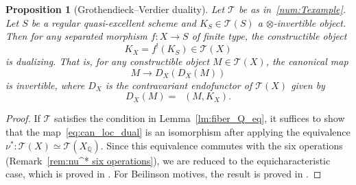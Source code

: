\documentclass[JEP,XML,SOM,Unicode]{cedram}
\newcommand{\T}{\mathscr T}
\DeclareMathOperator{\uHom}{\underline{Hom}}
\newcommand{\QQ} {\mathbb Q}
\newtheorem{prop}[thm]{Proposition}
\theoremstyle{remark}
\theoremstyle{definition}
\numberwithin{equation}{thm}
\begin{document}
\begin{prop}[Grothendieck--Verdier duality]\label{prop:duality}
Let $\T$ be as in~\ref{num:Texample}.
Let $S$ be a regular quasi-excellent scheme and $K_S \in \T(S)$ a $\otimes$-invertible object.
Then for any separated morphism $f:X\to S$ of finite type, the constructible object
\[K_{X}=f^!(K_S)\in\T(X)\]
is \emph{dualizing}.
That is, for any constructible object $M \in \T(X)$, the canonical map
\begin{equation}\label{eq:can_loc_dual}
M \to D_X(D_X(M))
\end{equation}
is invertible, where $D_X$ is the contravariant endofunctor of $\T(X)$ given by
\[ D_X(M) = \uHom(M, K_X). \]
\end{prop}

\begin{proof}
If $\T$ satisfies the condition in Lemma~\ref{lm:fiber_Q_eq}, it suffices to show that the map~\eqref{eq:can_loc_dual} is an isomorphism after applying the equivalence $\nu^* : \T(X) \simeq \T(X_\QQ)$.
Since this equivalence commutes with the six operations (Remark~\ref{rem:nu^* six operations}), we are reduced to the equicharacteristic case, which is proved in \cite[Th.\,2.4.9]{BD1}. For Beilinson motives, the result is proved in \cite[Th.\,2.3.2]{CisLect}.
\end{proof}
\end{document}
